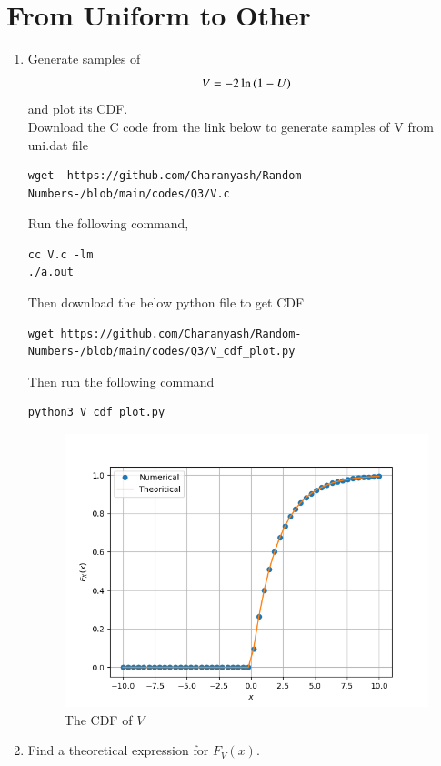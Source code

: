 \documentclass[journal,12pt,twocolumn]{IEEEtran}
\renewcommand\thesection{\arabic{section}}
\begin{document}
\section{From Uniform to Other}
\begin{enumerate}[label=\thesection.\arabic*,ref=\thesection.\theenumi]
%
\item
Generate samples of 
%
\begin{equation}
V = -2\ln\left(1-U\right)
\end{equation}
%
and plot its CDF.\\
\solution Download the C code from the link below to generate samples of V from uni.dat file
\begin{lstlisting}
wget  https://github.com/Charanyash/Random-Numbers-/blob/main/codes/Q3/V.c
\end{lstlisting}
Run the following command,
\begin{lstlisting}
cc V.c -lm
./a.out
\end{lstlisting}
Then download the below python file to get CDF
\begin{lstlisting}
wget https://github.com/Charanyash/Random-Numbers-/blob/main/codes/Q3/V_cdf_plot.py
\end{lstlisting}
Then run the following command
\begin{lstlisting}
python3 V_cdf_plot.py
\end{lstlisting}
\begin{figure}
\centering
\includegraphics[width=\columnwidth]{figs/V_cdf.png}
\caption{The CDF of $V$}
\label{fig:V_cdf}
\end{figure}
\item Find a theoretical expression for $F_V(x)$.\\

\end{enumerate}
\end{document}
